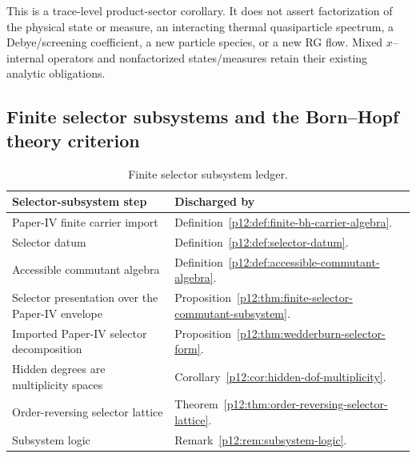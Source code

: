 \documentclass[12pt,a4paper]{article}
\begin{document}
\begin{remark}[Scope]
\label{p12:rem:v2102-finite-internal-momentum-trace-scope}
This is a trace-level product-sector corollary.  It does not assert
factorization of the physical state or measure, an interacting thermal
quasiparticle spectrum, a Debye/screening coefficient, a new particle species,
or a new RG flow.  Mixed $x$--internal operators and nonfactorized
states/measures retain their existing analytic obligations.
\end{remark}


\subsection{Finite selector subsystems and the Born--Hopf theory criterion}
\label{p12:app:finite-selector-subsystems}


\begin{table}[htbp]
\centering
\small
\begin{tabularx}{\textwidth}{@{}p{}X@{}}
\toprule
\textbf{Selector-subsystem step} & \textbf{Discharged by} \\
\midrule
Paper-IV finite carrier import & Definition~\ref{p12:def:finite-bh-carrier-algebra}. \\
Selector datum & Definition~\ref{p12:def:selector-datum}. \\
Accessible commutant algebra & Definition~\ref{p12:def:accessible-commutant-algebra}. \\
Selector presentation over the Paper-IV envelope & Proposition~\ref{p12:thm:finite-selector-commutant-subsystem}. \\
Imported Paper-IV selector decomposition & Proposition~\ref{p12:thm:wedderburn-selector-form}. \\
Hidden degrees are multiplicity spaces & Corollary~\ref{p12:cor:hidden-dof-multiplicity}. \\
Order-reversing selector lattice & Theorem~\ref{p12:thm:order-reversing-selector-lattice}. \\
Subsystem logic & Remark~\ref{p12:rem:subsystem-logic}. \\
\bottomrule
\end{tabularx}
\caption[Finite selector subsystem ledger]{Finite selector subsystem ledger.}
\label{p12:tab:finite-selector-subsystem-ledger}
\end{table}
\end{document}
